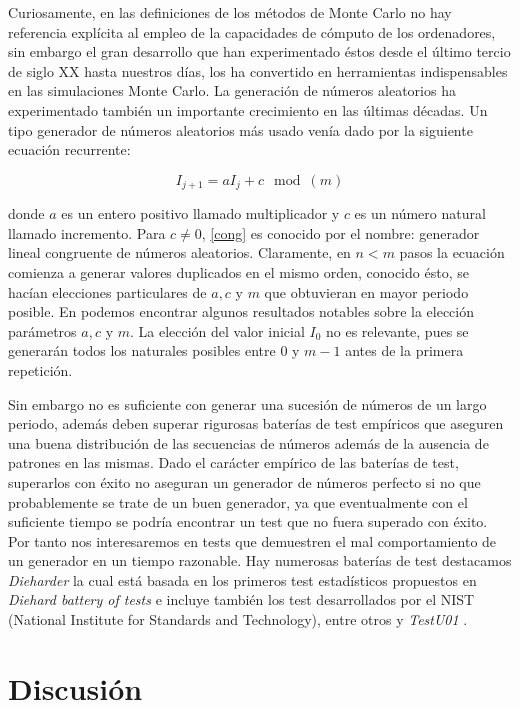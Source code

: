 \documentclass[../proyecto.tex]{memoir}
\begin{document}
Curiosamente, en las definiciones de los métodos de Monte Carlo no hay referencia explícita al empleo de la capacidades de cómputo de los ordenadores, sin embargo el gran desarrollo que han experimentado éstos desde el último tercio de siglo XX hasta nuestros días, los ha convertido en herramientas indispensables en las simulaciones Monte Carlo. La generación de números aleatorios ha experimentado también un importante crecimiento en las últimas décadas. Un tipo generador de números aleatorios más usado venía dado por la siguiente ecuación recurrente:

\begin{equation} \label{cong}
I_{j+1} = aI_{j} +c \mod (m)
\end{equation}

donde $a$ es un entero positivo llamado multiplicador y $c$ es un número natural llamado incremento. Para $c \neq 0$, \ref{cong} es conocido por el nombre: generador lineal congruente de números aleatorios. Claramente, en $n<m$ pasos la ecuación comienza a generar valores duplicados en el mismo orden, conocido ésto, se hacían elecciones particulares de $a,c$ y $m$ que obtuvieran en mayor periodo posible. En \cite{knuth} podemos encontrar algunos resultados notables sobre la elección parámetros $a,c$ y $m$. La elección del valor inicial $I_{0}$ no es relevante, pues se generarán todos los naturales posibles entre $0$ y $m-1$ antes de la primera repetición. 

Sin embargo no es suficiente con generar una sucesión de números de un largo periodo, además deben superar rigurosas baterías de test empíricos que aseguren una buena distribución de las secuencias de números además de la ausencia de patrones en las mismas. Dado el carácter empírico de las baterías de test, superarlos con éxito no aseguran un generador de números perfecto si no que probablemente se trate de un buen generador, ya que eventualmente con el suficiente tiempo se podría encontrar un test que no fuera superado con éxito. Por tanto nos interesaremos en tests que demuestren el mal comportamiento de un generador en un tiempo razonable. Hay numerosas baterías de test destacamos \textit{Dieharder} la cual está basada en los primeros test estadísticos propuestos en \textit{Diehard battery of tests} e incluye también los test desarrollados por el NIST (National Institute for Standards and Technology), entre otros y \textit{TestU01} \cite{dieharder,testu01}.



\section{Discusión}
\end{document}

